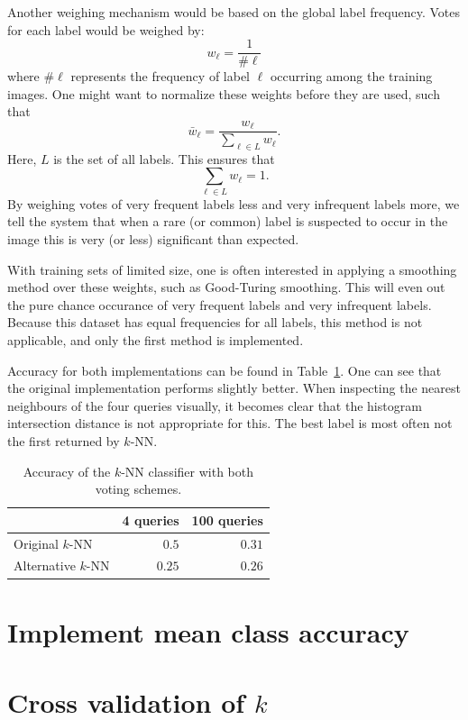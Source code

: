 \documentclass[a4paper,10pt,twoside]{article}
\begin{document}
Another weighing mechanism would be based on the global label frequency.  Votes for each label would be weighed by: \[ w_\ell = \frac{1}{\#\ell} \] where $\#\ell$ represents the frequency of label $\ell$ occurring among the training images.  One might want to normalize these weights before they are used, such that \[\bar w_\ell = \frac{w_\ell}{\sum_{\ell \in L} w_\ell}. \] Here, $L$ is the set of all labels.  This ensures that \[\sum_{\ell \in L} w_\ell = 1.\] By weighing votes of very frequent labels less and very infrequent labels more, we tell the system that when a rare (or common) label is suspected to occur in the image this is very (or less) significant than expected.

With training sets of limited size, one is often interested in applying a smoothing method over these weights, such as Good-Turing smoothing.  This will even out the pure chance occurance of very frequent labels and very infrequent labels.  Because this dataset has equal frequencies for all labels, this method is not applicable, and only the first method is implemented.

Accuracy for both implementations can be found in Table~\ref{t:knnacc}.  One can see that the original implementation performs slightly better.  When inspecting the nearest neighbours of the four queries visually, it becomes clear that the histogram intersection distance is not appropriate for this.  The best label is most often not the first returned by $k$-NN.

\begin{table}
  \centering
  \begin{tabular}{l|rr}
                       & 4 queries & 100 queries \\
    \hline
    Original $k$-NN    & $0.5$     & $0.31$ \\
    Alternative $k$-NN & $0.25$    & $0.26$ \\
  \end{tabular}
  \caption{Accuracy of the $k$-NN classifier with both voting schemes.}
  \label{t:knnacc}
\end{table}
\section{Implement mean class accuracy}

\section{Cross validation of $k$}
\end{document}
